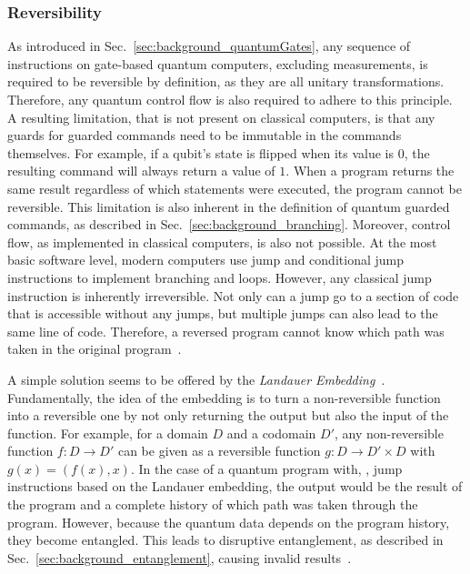 \subsubsection{Reversibility}
\label{sec:background_controlflow_reversibility}
As introduced in Sec.~\ref{sec:background_quantumGates}, any sequence of instructions on gate-based quantum computers, excluding measurements, is required to be reversible by definition, as they are all unitary transformations. Therefore, any quantum control flow is also required to adhere to this principle. A resulting limitation, that is not present on classical computers, is that any guards for guarded commands need to be immutable in the commands themselves. For example, if a qubit's state is flipped when its value is $0$, the resulting command will always return a value of $1$. When a program returns the same result regardless of which statements were executed, the program cannot be reversible. This limitation is also inherent in the definition of quantum guarded commands, as described in Sec.~\ref{sec:background_branching}.
Moreover, control flow, as implemented in classical computers, is also not possible. At the most basic software level, modern computers use jump and conditional jump instructions to implement branching and loops. However, any classical jump instruction is inherently irreversible. Not only can a jump go to a section of code that is accessible without any jumps, but multiple jumps can also lead to the same line of code. Therefore, a reversed program cannot know which path was taken in the original program~\cite{YVC24}.

A simple solution seems to be offered by the \emph{Landauer Embedding}~\cite{Land61}. Fundamentally, the idea of the embedding is to turn a non-reversible function into a reversible one by not only returning the output but also the input of the function. For example, for a domain $D$ and a codomain $D'$, any non-reversible function $f : D \to D'$ can be given as a reversible function $g : D \to D' \times D$ with $g(x) = (f(x), x)$. In the case of a quantum program with, \eg, jump instructions based on the Landauer embedding, the output would be the result of the program and a complete history of which path was taken through the program. However, because the quantum data depends on the program history, they become entangled. This leads to disruptive entanglement, as described in Sec.~\ref{sec:background_entanglement}, causing invalid results~\cite{YVC24}.


